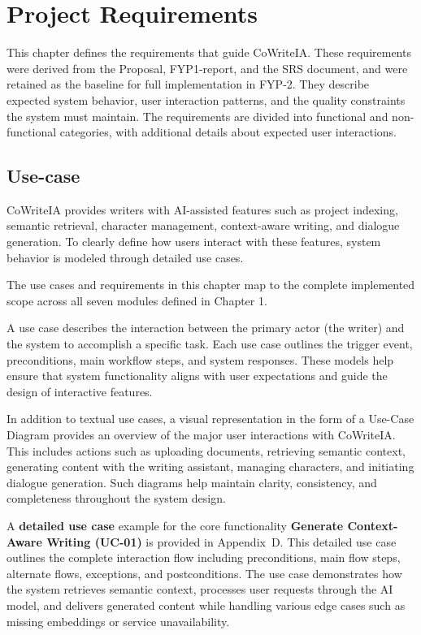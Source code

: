 \chapter{Project Requirements}
This chapter defines the requirements that guide CoWriteIA. These requirements were derived from the Proposal, FYP1-report, and the SRS document, and were retained as the baseline for full implementation in FYP-2. They describe expected system behavior, user interaction patterns, and the quality constraints the system must maintain. The requirements are divided into functional and non-functional categories, with additional details about expected user interactions.

\section{Use-case}

CoWriteIA provides writers with AI-assisted features such as project indexing, semantic retrieval, character management, context-aware writing, and dialogue generation. To clearly define how users interact with these features, system behavior is modeled through detailed use cases.

The use cases and requirements in this chapter map to the complete implemented scope across all seven modules defined in Chapter 1.

A use case describes the interaction between the primary actor (the writer) and the system to accomplish a specific task. Each use case outlines the trigger event, preconditions, main workflow steps, and system responses. These models help ensure that system functionality aligns with user expectations and guide the design of interactive features.

In addition to textual use cases, a visual representation in the form of a Use-Case Diagram provides an overview of the major user interactions with CoWriteIA. This includes actions such as uploading documents, retrieving semantic context, generating content with the writing assistant, managing characters, and initiating dialogue generation. Such diagrams help maintain clarity, consistency, and completeness throughout the system design.

A \textbf{detailed use case} example for the core functionality \textbf{Generate Context-Aware Writing (UC-01)} is provided in Appendix~D. This detailed use case outlines the complete interaction flow including preconditions, main flow steps, alternate flows, exceptions, and postconditions. The use case demonstrates how the system retrieves semantic context, processes user requests through the AI model, and delivers generated content while handling various edge cases such as missing embeddings or service unavailability.

